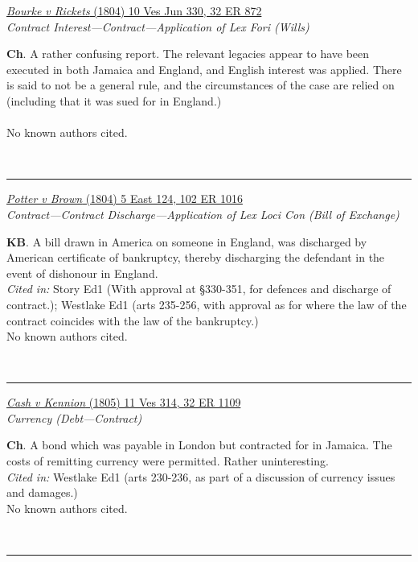 \documentclass[twoside]{article}
\begin{document}
        \begin{small}
        \begin{center}
        \href{https://heinonline.org/HOL/P?h=hein.engrep/engrc0032&i=880}{\textit{Bourke v Rickets} (1804) 10 Ves Jun 330, 32 ER 872} \label{22} \\ 
\textit{Contract Interest---Contract---Application of Lex Fori (Wills)}\\
        \end{center}
        \textbf{Ch}. A rather confusing report. The relevant legacies appear to have been executed in both Jamaica and England, and English interest was applied. There is said to not be a general rule, and the circumstances of the case are relied on (including that it was sued for in England.)\\\\No known authors cited.
        \end{small}\\
        \rule{\textwidth}{0.5pt}
        

        \begin{small}
        \begin{center}
        \href{https://heinonline.org/HOL/P?h=hein.engrep/engrf0102&i=1020}{\textit{Potter v Brown} (1804) 5 East 124, 102 ER 1016} \label{38} \\ 
\textit{Contract---Contract Discharge---Application of Lex Loci Con (Bill of Exchange)}\\
        \end{center}
        \textbf{KB}. A bill drawn in America on someone in England, was discharged by American certificate of bankruptcy, thereby discharging the defendant in the event of dishonour in England.\\\textit{Cited in: }Story Ed1 (With approval at §330-351, for defences and discharge of contract.); Westlake Ed1 (arts 235-256, with approval as for where the law of the contract coincides with the law of the bankruptcy.)\\No known authors cited.
        \end{small}\\
        \rule{\textwidth}{0.5pt}
        

        \begin{small}
        \begin{center}
        \href{https://heinonline.org/HOL/P?h=hein.engrep/engrc0032&i=1117}{\textit{Cash v Kennion} (1805) 11 Ves 314, 32 ER 1109} \label{37} \\ 
\textit{Currency (Debt---Contract)}\\
        \end{center}
        \textbf{Ch}. A bond which was payable in London but contracted for in Jamaica. The costs of remitting currency were permitted. Rather uninteresting.\\\textit{Cited in: }Westlake Ed1 (arts 230-236, as part of a discussion of currency issues and damages.)\\No known authors cited.
        \end{small}\\
        \rule{\textwidth}{0.5pt}
        
\end{document}
